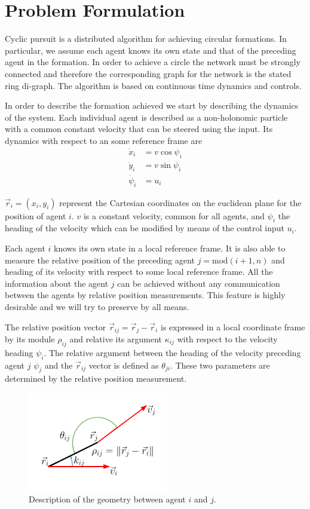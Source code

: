 \section{Problem Formulation}

Cyclic pursuit is a distributed algorithm for achieving circular formations. In particular, we assume each agent knows its own state and that of the preceding agent in the formation. In order to achieve a circle the network must be strongly connected and therefore the corresponding graph for the network is the stated ring di-graph. The algorithm is based on continuous time dynamics and controls.

In order to describe the formation achieved we start by describing the dynamics of the system. Each individual agent is described as a non-holonomic particle with a common constant velocity that can be steered using the input. Its dynamics with respect to an some reference frame are
\begin{align}
\dot{x}_i &= v \cos \psi_i \\
\dot{y}_i &= v \sin \psi_i \\
\dot{\psi}_i &= u_i  
\end{align}

$\vec{r}_i=(x_i,y_i)$ represent the Cartesian coordinates on the euclidean plane for the position of agent $i$. $v$ is a constant velocity, common for all agents, and $\psi_i$ the heading of the velocity which can be modified by means of the control input $u_i$.

Each agent $i$ knows its own state in a local reference frame. It is also able to measure the relative position of the preceding agent $j= \textrm{mod}(i+1,n)$ and heading of its velocity with respect to some local reference frame. All the information about the agent $j$ can be achieved without any communication between the agents by relative position measurements. This feature is highly desirable and we will try to preserve by all means.

The relative position vector $\vec{r}_{ij} = \vec{r}_j - \vec{r}_i$ is expressed in a local coordinate frame by its module $\rho_{ij}$ and relative its argument $\kappa_{ij}$ with respect to the velocity heading $\psi_i$. The relative argument between the heading of the velocity preceding agent $j$ $\psi_j$ and the $\vec{r}_{ij}$ vector is defined as $\theta_{ji}$. These two parameters are determined by the relative position measurement.
\begin{figure}[h]
	\centering
	\includegraphics[height=1.7in]{Attachments/Geometry.png}
	\caption{Description of the geometry between agent $i$ and $j$.}
	\label{fig:Geometry}
\end{figure}

